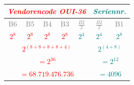 \begin{frame}
\begin{footnotesize}
\begin{columns}[t]
  \begin{center}
    \renewcommand{\arraystretch}{1.5}
    \begin{tabular}{| c | c | c | c | c || c | c |}
      \hline
      \multicolumn{5}{|c||}{\tiny{\textit{\textrm{\textcolor{red}{Vendorencode OUI-36}}}}} 
        & \multicolumn{2}{c|}{{\tiny{\textit{\textrm{\textcolor{teal}{Seriennr.}}}}}} \\
      \hline
      \textcolor{gray}{\tiny{B6}} & \textcolor{gray}{\tiny{B5}} 
        & \textcolor{gray}{\tiny{B4}} & \textcolor{gray}{\tiny{B3}} 
          & \textcolor{gray}{\tiny{$\frac{B2}{2}$}} 
            & \textcolor{gray}{\tiny{$\frac{B2}{2}$}} 
              & \textcolor{gray}{\tiny{B1}} \\
      \hline
      \textcolor{red}{\texttt{$2^8$}} & \textcolor{red}{\texttt{$2^8$}} 
        & \textcolor{red}{\texttt{$2^8$}} & \textcolor{red}{\texttt{$2^8$}}
          & \textcolor{teal}{\texttt{$2^4$}} & \textcolor{teal}{\texttt{$2^4$}} 
            & \textcolor{teal}{\texttt{$2^8$}} \\
      \hline
      \hline
      \multicolumn{5}{|c||}{\textcolor{red}{\texttt{$2^{(8 + 8 + 8 + 8 + 4)}$}}}
        & \multicolumn{2}{c|}{\textcolor{teal}{\texttt{$2^{(4 + 8)}$}}} \\
      \hline
      \hline
      \multicolumn{5}{|c||}{\textcolor{red}{\texttt{$= 2^{36}$}}}
        & \multicolumn{2}{c|}{\textcolor{teal}{\texttt{$= 2^{12}$}}} \\
      \hline
        \multicolumn{5}{|c||}{\textcolor{red}{\texttt{$= 68.719.476.736$}}}
        & \multicolumn{2}{c|}{\textcolor{teal}{\texttt{$= 4096$}}} \\
      \hline
    \end{tabular}
  \end{center}
\end{columns}
 
\vspace{1cm}



\end{footnotesize}



\end{frame}
